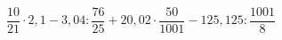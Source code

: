 \begin{ex}[type=calculate]
	\begin{condition}
		\( \dfrac{10}{21}\cdot2,1-3,04:\dfrac{76}{25}+20,02\cdot\dfrac{50}{1001}-125,125:\dfrac{1001}{8} \)
	\end{condition}
\end{ex}